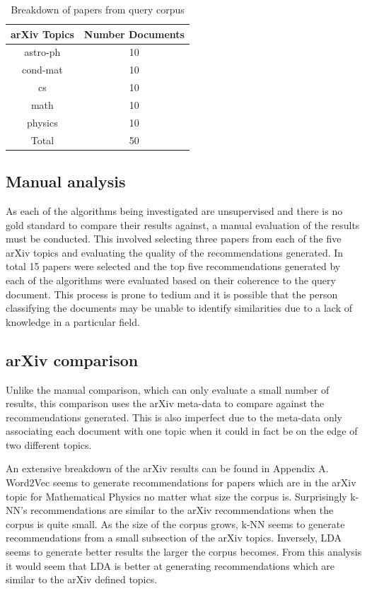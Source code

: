 \begin{table}[h]
    \centering
    \begin{tabular}{|c c|}
         \hline
         arXiv Topics & Number Documents \\ [0.5ex]
         \hline\hline
         astro-ph & 10 \\
         cond-mat & 10 \\
         cs & 10 \\
         math & 10 \\
         physics & 10 \\ [0.5ex]
         \hline\hline
         Total & 50\\ [1ex]
         \hline
    \end{tabular}
    \caption{Breakdown of papers from query corpus}
    \label{table:queryBreakdown}
\end{table}

\subsection{Manual analysis}
As each of the algorithms being investigated are unsupervised and there is no gold standard to compare their results against, a manual evaluation of the results must be conducted.
This involved selecting three papers from each of the five arXiv topics and evaluating the quality of the recommendations generated.
In total 15 papers were selected and the top five recommendations generated by each of the algorithms were evaluated based on their coherence to the query document.
This process is prone to tedium and it is possible that the person classifying the documents may be unable to identify similarities due to a lack of knowledge in a particular field.

\subsection{arXiv comparison}
Unlike the manual comparison, which can only evaluate a small number of results, this comparison uses the arXiv meta-data to compare against the recommendations generated.
This is also imperfect due to the meta-data only associating each document with one topic when it could in fact be on the edge of two different topics.

An extensive breakdown of the arXiv results can be found in Appendix A.
Word2Vec seems to generate recommendations for papers which are in the arXiv topic for Mathematical Physics no matter what size the corpus is.
Surprisingly k-NN's recommendations are similar to the arXiv recommendations when the corpus is quite small.
As the size of the corpus grows, k-NN seems to generate recommendations from a small subsection of the arXiv topics.
Inversely, LDA seems to generate better results the larger the corpus becomes.
From this analysis it would seem that LDA is better at generating recommendations which are similar to the arXiv defined topics.

